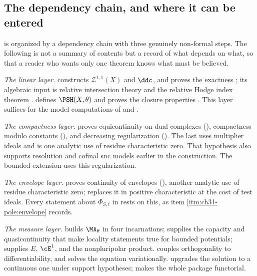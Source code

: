 \subsection{The dependency chain, and where it can be entered}
\label{sec:ch31-dependency}

 is organized by a dependency chain with three genuinely
non-formal steps.  The following is not a summary of contents but a record
of what depends on what, so that a reader who wants only one theorem knows
what must be believed.

\emph{The linear layer.}   constructs
$\mathcal Z^{1,1}(X)$ and $\ddc$, and proves the exactness
; its algebraic input is relative intersection
theory and the relative Hodge index theorem
.   defines
$\PSH(X,\theta)$ and proves the closure properties
.  This layer suffices for
the model computations of  and
.

\emph{The compactness layer.}   proves
equicontinuity on dual complexes
(), compactness modulo constants
(), and decreasing regularization
().  The last uses multiplier
ideals and is one analytic use of residue characteristic zero.  That
hypothesis also supports resolution and cofinal snc models earlier in the
construction.  The bounded extension uses this regularization.

\emph{The envelope layer.}   proves continuity of
envelopes (), another analytic use of
residue characteristic zero; 
replaces it in positive characteristic at the cost of test ideals.  Every
statement about $\Phi_{S,t}$ in  rests on this,
as item \cref{itm:ch31-pole:envelope} records.

\emph{The measure layer.}   builds $\MA_\theta$ in four
incarnations;  supplies the capacity and
quasicontinuity that make locality statements true for bounded potentials;
 supplies $E$, $\cE^1$, and the nonpluripolar
product.   couples orthogonality to
differentiability, and  solves the
equation variationally.   upgrades the solution to
a continuous one under support hypotheses;
 makes the whole package functorial.

